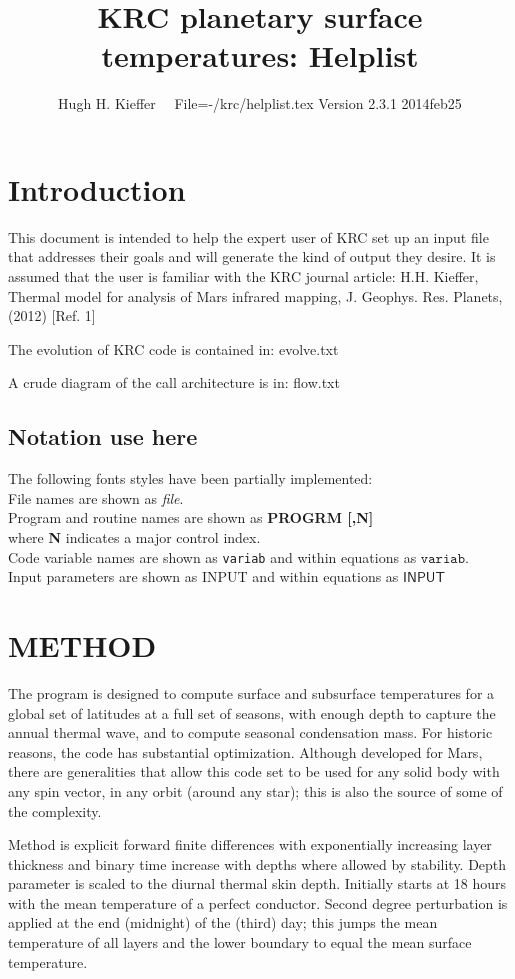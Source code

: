 \documentclass[draft]{article}  %
\title{KRC planetary surface temperatures: Helplist}
\author{Hugh H. Kieffer  \ \ File=-/krc/helplist.tex Version 2.3.1 2014feb25}
\newcommand{\qi}{\\ \hspace*{2.em}}      %
\newcommand{\qii}{\\ \hspace*{4.em}}     %
\newcommand{\np}{\textbf}  %
\newcommand{\nf}{\textit}  %
\newcommand{\nv}{\texttt}  %
\newcommand{\nvf}{\mathtt} %
\newcommand{\nj}{\textsf}  %
\newcommand{\njf}{\mathsf} %
\begin{document}
\maketitle

\tableofcontents


\section{Introduction} %

This document is intended to help the expert user of KRC set up an input file
that addresses their goals and will generate the kind of output they desire. It
is assumed that the user is familiar with the KRC journal article: H.H. Kieffer,
Thermal model for analysis of Mars infrared mapping, J. Geophys. Res. Planets,
(2012) [Ref. 1]

The evolution of KRC code is contained in:  evolve.txt 

A crude diagram of the call architecture is in:  flow.txt 

\subsection{Notation use here}
The following fonts styles have been partially implemented: 
\qi File names are shown as \nf{file}. 
\qi Program and routine names are shown as \np{PROGRM [,N]} 
\qii where \np{N} indicates a major control index. 
\qi Code variable names are shown as \nv{variab} and within equations as $\nvf{variab}$.  
\qi Input parameters are shown as \nj{INPUT} and within equations as $\njf{INPUT}$


\section{METHOD}

The program is designed to compute surface and subsurface temperatures for a
global set of latitudes at a full set of seasons, with enough depth to capture
the annual thermal wave, and to compute seasonal condensation mass. For historic
reasons, the code has substantial optimization. Although developed for Mars,
there are generalities that allow this code set to be used for any solid body
with any spin vector, in any orbit (around any star); this is also the source of
some of the complexity.
 
Method is explicit forward finite differences with exponentially increasing
layer thickness and binary time increase with depths where allowed by stability.
Depth parameter is scaled to the diurnal thermal skin depth.  Initially starts
at 18 hours with the mean temperature of a perfect conductor.  Second degree
perturbation is applied at the end (midnight) of the (third) day; this jumps the
mean temperature of all layers and the lower boundary to equal the mean surface
temperature.
\end{document}
